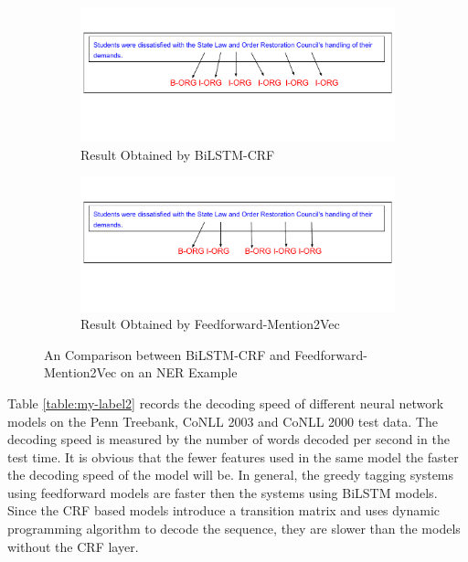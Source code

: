\begin{figure}
\hspace{-1cm}
\begin{subfigure}{\linewidth}
\includegraphics[width=1.1\linewidth]{NERbilstm2.pdf}
\vspace{-3cm}
\caption{Result Obtained by BiLSTM-CRF}
\end{subfigure}\par\medskip
\hspace{-1cm}
\begin{subfigure}{\linewidth}
\vspace{-1cm}
\includegraphics[width=1.1\linewidth]{NERmen.pdf}
\vspace{-3cm}
\caption{Result Obtained by Feedforward-Mention2Vec}
\end{subfigure}
\caption{An Comparison between BiLSTM-CRF and Feedforward-Mention2Vec on an NER Example}
\label{fig:comp2}
\end{figure}

Table \ref{table:my-label2} records the decoding speed of different neural network models on the Penn Treebank, CoNLL 2003 and CoNLL 2000 test data. The decoding speed is measured by the number of words decoded per second in the test time. It is obvious that the fewer features used in the same model the faster the decoding speed of the model will be. In general, the greedy tagging systems using feedforward models are faster then the systems using BiLSTM models. Since the CRF based models introduce a transition matrix and uses dynamic programming algorithm to decode the sequence, they are slower than the models without the CRF layer.

